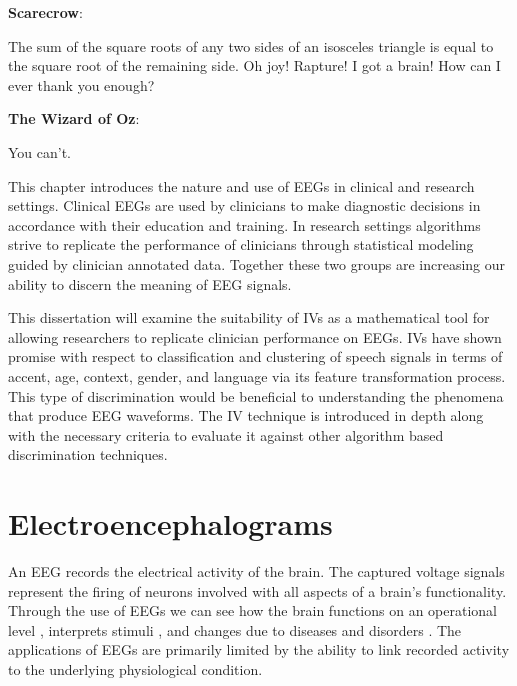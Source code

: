 
\begin{displayquote}
\begin{centering}
\begin{singlespace}
\textbf{Scarecrow}:
\par
The sum of the square roots of any two sides of an isosceles triangle is equal to the square root of the remaining side. Oh joy! Rapture! I got a brain! How can I ever thank you enough?
\par
\textbf{The Wizard of Oz}:
\par
You can't.
\par
\end{singlespace}
\end{centering}
\end{displayquote}


This chapter introduces the nature and use of \acp{EEG} in clinical and research settings. Clinical \acp{EEG} are used by clinicians to make diagnostic decisions in accordance with their education and training. In research settings algorithms strive to replicate the performance of clinicians through statistical modeling guided by clinician annotated data. Together these two groups are increasing our ability to discern the meaning of \ac{EEG} signals.

This dissertation will examine the suitability of \acp{IV} as a mathematical tool for allowing researchers to replicate clinician performance on \acp{EEG}. \acp{IV} have shown promise with respect to classification and clustering of speech signals in terms of accent, age, context, gender, and language via its feature transformation process. This type of discrimination would be beneficial to understanding the phenomena that produce \ac{EEG} waveforms. The \ac{IV} technique is introduced in depth along with the necessary criteria to evaluate it against other algorithm based discrimination techniques.

\section{Electroencephalograms}
\label{sec:eeg}

An \ac{EEG} records the electrical activity of the brain. The captured voltage signals represent the firing of neurons involved with all aspects of a brain's functionality. Through the use of \acp{EEG} we can see how the brain functions on an operational level \cite{Coan2004}, interprets stimuli \cite{Doppelmayr1998a}, and changes due to diseases and disorders \cite{Porjesz2005}. The applications of \acp{EEG} are primarily limited by the ability to link recorded activity to the underlying physiological condition.

